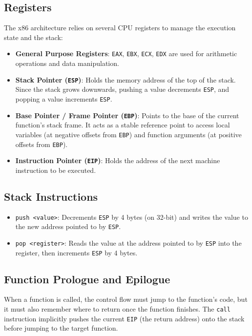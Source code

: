 \subsection{Registers}
The x86 architecture relies on several CPU registers to manage the execution state and the stack:
\begin{itemize}
    \item \textbf{General Purpose Registers}: \texttt{EAX}, \texttt{EBX}, \texttt{ECX}, \texttt{EDX} are used for arithmetic operations and data manipulation.
    \item \textbf{Stack Pointer (\texttt{ESP})}: Holds the memory address of the top of the stack. Since the stack grows downwards, pushing a value decrements \texttt{ESP}, and popping a value increments \texttt{ESP}.
    \item \textbf{Base Pointer / Frame Pointer (\texttt{EBP})}: Points to the base of the current function's stack frame. It acts as a stable reference point to access local variables (at negative offsets from \texttt{EBP}) and function arguments (at positive offsets from \texttt{EBP}).
    \item \textbf{Instruction Pointer (\texttt{EIP})}: Holds the address of the next machine instruction to be executed.
\end{itemize}

\subsection{Stack Instructions}
\begin{itemize}
    \item \texttt{push <value>}: Decrements \texttt{ESP} by 4 bytes (on 32-bit) and writes the value to the new address pointed to by \texttt{ESP}.
    \item \texttt{pop <register>}: Reads the value at the address pointed to by \texttt{ESP} into the register, then increments \texttt{ESP} by 4 bytes.
\end{itemize}

\subsection{Function Prologue and Epilogue}
When a function is called, the control flow must jump to the function's code, but it must also remember where to return once the function finishes. The \texttt{call} instruction implicitly pushes the current \texttt{EIP} (the return address) onto the stack before jumping to the target function.


